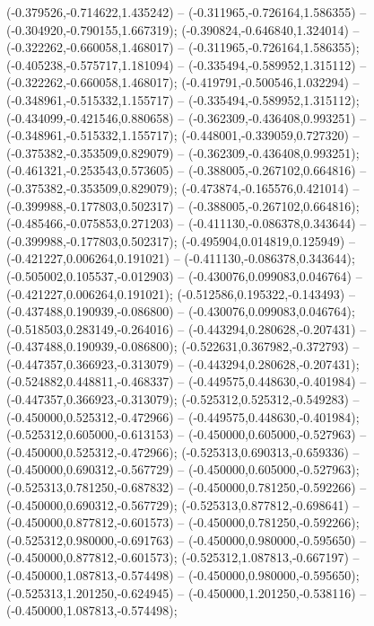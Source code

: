  (-0.379526,-0.714622,1.435242) -- (-0.311965,-0.726164,1.586355) -- (-0.304920,-0.790155,1.667319);
 (-0.390824,-0.646840,1.324014) -- (-0.322262,-0.660058,1.468017) -- (-0.311965,-0.726164,1.586355);
 (-0.405238,-0.575717,1.181094) -- (-0.335494,-0.589952,1.315112) -- (-0.322262,-0.660058,1.468017);
 (-0.419791,-0.500546,1.032294) -- (-0.348961,-0.515332,1.155717) -- (-0.335494,-0.589952,1.315112);
 (-0.434099,-0.421546,0.880658) -- (-0.362309,-0.436408,0.993251) -- (-0.348961,-0.515332,1.155717);
 (-0.448001,-0.339059,0.727320) -- (-0.375382,-0.353509,0.829079) -- (-0.362309,-0.436408,0.993251);
 (-0.461321,-0.253543,0.573605) -- (-0.388005,-0.267102,0.664816) -- (-0.375382,-0.353509,0.829079);
 (-0.473874,-0.165576,0.421014) -- (-0.399988,-0.177803,0.502317) -- (-0.388005,-0.267102,0.664816);
 (-0.485466,-0.075853,0.271203) -- (-0.411130,-0.086378,0.343644) -- (-0.399988,-0.177803,0.502317);
 (-0.495904,0.014819,0.125949) -- (-0.421227,0.006264,0.191021) -- (-0.411130,-0.086378,0.343644);
 (-0.505002,0.105537,-0.012903) -- (-0.430076,0.099083,0.046764) -- (-0.421227,0.006264,0.191021);
 (-0.512586,0.195322,-0.143493) -- (-0.437488,0.190939,-0.086800) -- (-0.430076,0.099083,0.046764);
 (-0.518503,0.283149,-0.264016) -- (-0.443294,0.280628,-0.207431) -- (-0.437488,0.190939,-0.086800);
 (-0.522631,0.367982,-0.372793) -- (-0.447357,0.366923,-0.313079) -- (-0.443294,0.280628,-0.207431);
 (-0.524882,0.448811,-0.468337) -- (-0.449575,0.448630,-0.401984) -- (-0.447357,0.366923,-0.313079);
 (-0.525312,0.525312,-0.549283) -- (-0.450000,0.525312,-0.472966) -- (-0.449575,0.448630,-0.401984);
 (-0.525312,0.605000,-0.613153) -- (-0.450000,0.605000,-0.527963) -- (-0.450000,0.525312,-0.472966);
 (-0.525313,0.690313,-0.659336) -- (-0.450000,0.690312,-0.567729) -- (-0.450000,0.605000,-0.527963);
 (-0.525313,0.781250,-0.687832) -- (-0.450000,0.781250,-0.592266) -- (-0.450000,0.690312,-0.567729);
 (-0.525313,0.877812,-0.698641) -- (-0.450000,0.877812,-0.601573) -- (-0.450000,0.781250,-0.592266);
 (-0.525312,0.980000,-0.691763) -- (-0.450000,0.980000,-0.595650) -- (-0.450000,0.877812,-0.601573);
 (-0.525312,1.087813,-0.667197) -- (-0.450000,1.087813,-0.574498) -- (-0.450000,0.980000,-0.595650);
 (-0.525313,1.201250,-0.624945) -- (-0.450000,1.201250,-0.538116) -- (-0.450000,1.087813,-0.574498);
